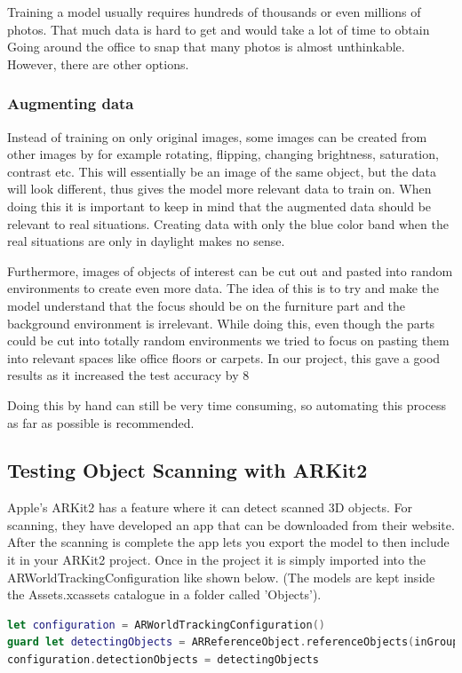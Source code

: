 Training a model usually requires hundreds of thousands or even millions of photos. That much data is hard to get and would take a lot of time to obtain Going around the office to snap that many photos is almost unthinkable.
However, there are other options.

\subsubsection{Augmenting data}
Instead of training on only original images, some images can be created from other images by for example rotating, flipping, changing brightness, saturation, contrast etc.  This will essentially be an image of the same object, but the data will look different, thus gives the model more relevant data to train on.
When doing this it is important to keep in mind that the augmented data should be relevant to real situations.
Creating data with only the blue color band when the real situations are only in daylight makes no sense.

Furthermore, images of objects of interest can be cut out and pasted into random environments to create even more data.
The idea of this is to try and make the model understand that the focus should be on the furniture part and the background environment is irrelevant. While doing this, even though the parts could be cut into totally random environments we tried to focus on pasting them into relevant spaces like office floors or carpets.
In our project, this gave a good results as it increased the test accuracy by 8%

Doing this by hand can still be very time consuming, so automating this process as far as possible is recommended.

\subsection{Testing Object Scanning with ARKit2}
Apple's ARKit2 has a feature where it can detect scanned 3D objects. For scanning, they have developed an app that can be downloaded from their website. \cite{ARScanning}
After the scanning is complete the app lets you export the model to then include it in your ARKit2 project. Once in the project it is simply imported into the ARWorldTrackingConfiguration like shown below. (The models are kept inside the Assets.xcassets catalogue in a folder called 'Objects').

\begin{lstlisting}[language=swift]
let configuration = ARWorldTrackingConfiguration()
guard let detectingObjects = ARReferenceObject.referenceObjects(inGroupNamed: "Objects", bundle: nil) else { return }
configuration.detectionObjects = detectingObjects
\end{lstlisting}

